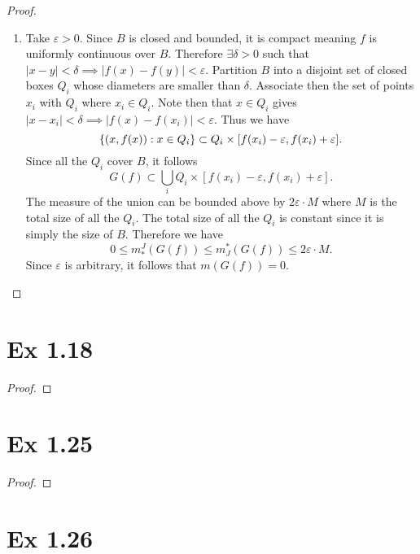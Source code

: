 \documentclass{eeleyes}
\newcommand\eps{\varepsilon}
\begin{document}
\begin{proof}
    \begin{enumerate}[label=\roman*)]
        \item Take $\eps > 0$. Since $B$ is closed and bounded, it is compact meaning $f$ is uniformly continuous over $B$. Therefore $\exists \delta > 0$ such that $|x-y| < \delta \implies |f(x) - f(y)| < \eps$. Partition $B$ into a disjoint set of closed boxes $Q_i$ whose diameters are smaller than $\delta$. Associate then the set of points $x_i$ with $Q_i$ where $x_i \in Q_i$. Note then that $x \in Q_i$ gives $|x - x_i| < \delta \implies |f(x) - f(x_i)| < \eps$. Thus we have
        \[
            \qty{(x,f(x)) : x \in Q_i} \subset Q_i \times [f(x_i) - \eps, f(x_i) + \eps]
        .\]
        Since all the $Q_i$ cover $B$, it follows
        \[
            G(f) \subset \bigcup_i Q_i \times [f(x_i) - \eps, f(x_i) + \eps]
        .\]
        The measure of the union can be bounded above by $2 \eps \cdot M$ where $M$ is the total size of all the $Q_i$. The total size of all the $Q_i$ is constant since it is simply the size of $B$. Therefore we have
        \[
            0 \leq m_*^J(G(f)) \leq m^*_J(G(f)) \leq 2 \eps \cdot M
        .\]
        Since $\eps$ is arbitrary, it follows that $m(G(f)) = 0$.
    \end{enumerate}
\end{proof}

\section*{Ex 1.18}

\begin{proof}
    
\end{proof}

\section*{Ex 1.25}

\begin{proof}
    
\end{proof}

\section*{Ex 1.26}
\end{document}
